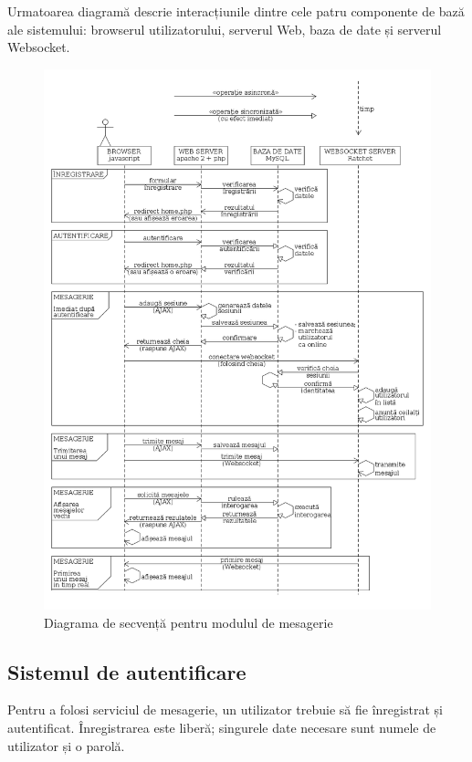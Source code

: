 \documentclass[12pt,a4paper]{article}
\begin{document}
Urmatoarea diagramă descrie interacțiunile dintre cele patru componente 
de bază ale sistemului: browserul utilizatorului, serverul Web, baza de date și 
serverul Websocket.

%
\newpage
	\begin{figure}[!ht]
	\centering
	\includegraphics[height=0.97\textheight]{diagrame/chat_sequence.png}
	\vspace{-20pt} 
	\caption{Diagrama de secvență pentru modulul de mesagerie \label{overflow}}
	\vspace{-20pt} 
\end{figure}

\subsection{Sistemul de autentificare}
Pentru a folosi serviciul de mesagerie, un utilizator trebuie să fie înregistrat și autentificat. Înregistrarea este liberă; singurele date necesare sunt numele de utilizator
și o parolă.
\end{document}
